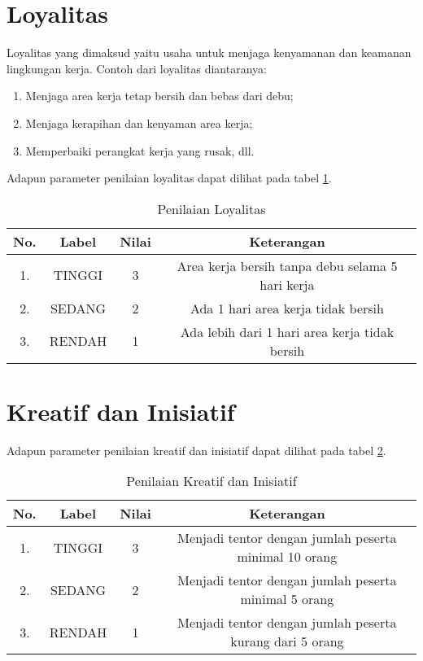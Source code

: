 \section{Loyalitas}
Loyalitas yang dimaksud yaitu usaha untuk menjaga kenyamanan dan keamanan lingkungan kerja. Contoh dari loyalitas diantaranya:
\begin{enumerate}
\item Menjaga area kerja tetap bersih dan bebas dari debu;
\item Menjaga kerapihan dan kenyaman area kerja;
\item Memperbaiki perangkat kerja yang rusak, dll.
\end{enumerate}
Adapun parameter penilaian loyalitas dapat dilihat pada tabel \ref{tab:nilailoyalitas}.

\begin{table}[H]
\caption{Penilaian Loyalitas}
\centering
\begin{tabular}{|c|c|c|c|}
\hline
\textbf{No.}&\textbf{Label}&\textbf{Nilai}&\textbf{Keterangan}\\
\hline
1.&TINGGI&3&Area kerja bersih tanpa debu selama 5 hari kerja\\
\hline
2.&SEDANG&2&Ada 1 hari area kerja tidak bersih\\
\hline
3.&RENDAH&1&Ada lebih dari 1 hari area kerja tidak bersih\\
\hline
\end{tabular}
\label{tab:nilailoyalitas}
\end{table}

\section{Kreatif dan Inisiatif}

Adapun parameter penilaian kreatif dan inisiatif dapat dilihat pada tabel \ref{tab:nilaikreatifinisiatif}.

\begin{table}[H]
\caption{Penilaian Kreatif dan Inisiatif}
\centering
\begin{tabular}{|c|c|c|c|}
\hline
\textbf{No.}&\textbf{Label}&\textbf{Nilai}&\textbf{Keterangan}\\
\hline
1.&TINGGI&3&Menjadi tentor dengan jumlah peserta minimal 10 orang\\
\hline
2.&SEDANG&2&Menjadi tentor dengan jumlah peserta minimal 5 orang\\
\hline
3.&RENDAH&1&Menjadi tentor dengan jumlah peserta kurang dari 5 orang\\
\hline
\end{tabular}
\label{tab:nilaikreatifinisiatif}
\end{table}


